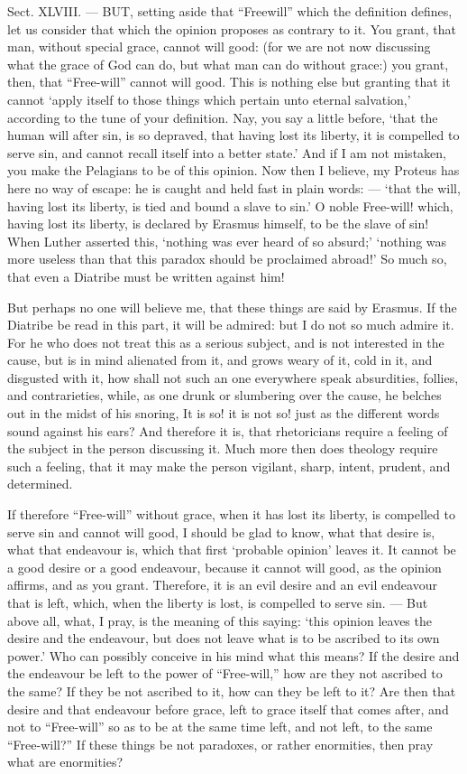 Sect. XLVIII. — BUT, setting aside that “Freewill” which the definition defines, let us consider that which the opinion proposes as contrary to it. You grant, that man, without special grace, cannot will good: (for we are not now discussing what the grace of God can do, but what man can do without grace:) you grant, then, that “Free-will” cannot will good. This is nothing else but granting that it cannot ‘apply itself to those things which pertain unto eternal salvation,’ according to the tune of your definition. Nay, you say a little before, ‘that the human will after sin, is so depraved, that having lost its liberty, it is compelled to serve sin, and cannot recall itself into a better state.’ And if I am not mistaken, you make the Pelagians to be of this opinion. Now then I believe, my Proteus has here no way of escape: he is caught and held fast in plain words: — ‘that the will, having lost its liberty, is tied and bound a slave to sin.’ O noble Free-will! which, having lost its liberty, is declared by Erasmus himself, to be the slave of sin! When Luther asserted this, ‘nothing was ever heard of so absurd;’ ‘nothing was more useless than that this paradox should be proclaimed abroad!’ So much so, that even a Diatribe must be written against him!

But perhaps no one will believe me, that these things are said by Erasmus. If the Diatribe be read in this part, it will be admired: but I do not so much admire it. For he who does not treat this as a serious subject, and is not interested in the cause, but is in mind alienated from it, and grows weary of it, cold in it, and disgusted with it, how shall not such an one everywhere speak absurdities, follies, and contrarieties, while, as one drunk or slumbering over the cause, he belches out in the midst of his snoring, It is so! it is not so! just as the different words sound against his ears? And therefore it is, that rhetoricians require a feeling of the subject in the person discussing it. Much more then does theology require such a feeling, that it may make the person vigilant, sharp, intent, prudent, and determined.

If therefore “Free-will” without grace, when it has lost its liberty, is compelled to serve sin and cannot will good, I should be glad to know, what that desire is, what that endeavour is, which that first ‘probable opinion’ leaves it. It cannot be a good desire or a good endeavour, because it cannot will good, as the opinion affirms, and as you grant. Therefore, it is an evil desire and an evil endeavour that is left, which, when the liberty is lost, is compelled to serve sin. — But above all, what, I pray, is the meaning of this saying: ‘this opinion leaves the desire and the endeavour, but does not leave what is to be ascribed to its own power.’ Who can possibly conceive in his mind what this means? If the desire and the endeavour be left to the power of “Free-will,” how are they not ascribed to the same? If they be not ascribed to it, how can they be left to it? Are then that desire and that endeavour before grace, left to grace itself that comes after, and not to “Free-will” so as to be at the same time left, and not left, to the same “Free-will?” If these things be not paradoxes, or rather enormities, then pray what are enormities?

